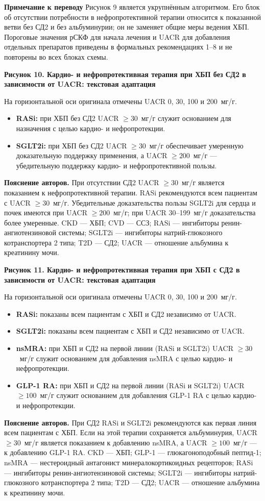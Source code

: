 \documentclass[11pt,a4paper]{article}
\newcommand{\editorial}[1]{\par\begingroup\small\color{black!70}\textbf{Примечание к переводу} #1\par\endgroup}
\newcommand{\heading}[1]{\par\medskip\textbf{#1}\par}
\begin{document}
\editorial{Рисунок 9 является укрупнённым алгоритмом. Его блок об отсутствии потребности в нефропротективной терапии относится к показанной ветви без СД2 и без альбуминурии; он не заменяет общие меры ведения ХБП. Пороговые значения рСКФ для начала лечения и UACR для добавления отдельных препаратов приведены в формальных рекомендациях 1--8 и не повторены во всех блоках схемы.}

\heading{Рисунок 10. Кардио- и нефропротективная терапия при ХБП без СД2 в зависимости от UACR: текстовая адаптация}
На горизонтальной оси оригинала отмечены UACR 0, 30, 100 и 200~мг/г.
\begin{itemize}
\item \textbf{RASi:} при ХБП без СД2 UACR $\geq30$~мг/г служит основанием для назначения с целью кардио- и нефропротекции.
\item \textbf{SGLT2i:} при ХБП без СД2 UACR $\geq30$~мг/г обеспечивает умеренную доказательную поддержку применения, а UACR $\geq200$~мг/г --- убедительную поддержку кардио- и нефропротективной пользы.
\end{itemize}
\textbf{Пояснение авторов.} При отсутствии СД2 UACR $\geq30$~мг/г является показанием к нефропротективной терапии. RASi рекомендуются всем пациентам с UACR $\geq30$~мг/г. Убедительные доказательства пользы SGLT2i для сердца и почек имеются при UACR $\geq200$~мг/г; при UACR 30--199~мг/г доказательства более умеренные. CKD --- ХБП; CVD --- ССЗ; RASi --- ингибиторы ренин-ангиотензиновой системы; SGLT2i --- ингибиторы натрий-глюкозного котранспортера 2 типа; T2D --- СД2; UACR --- отношение альбумина к креатинину мочи.

\heading{Рисунок 11. Кардио- и нефропротективная терапия при ХБП с СД2 в зависимости от UACR: текстовая адаптация}
На горизонтальной оси оригинала отмечены UACR 0, 30, 100 и 200~мг/г.
\begin{itemize}
\item \textbf{RASi:} показаны всем пациентам с ХБП и СД2 независимо от UACR.
\item \textbf{SGLT2i:} показаны всем пациентам с ХБП и СД2 независимо от UACR.
\item \textbf{nsMRA:} при ХБП и СД2 на первой линии (RASi и SGLT2i) UACR $\geq30$~мг/г служит основанием для добавления nsMRA с целью кардио- и нефропротекции.
\item \textbf{GLP-1 RA:} при ХБП и СД2 на первой линии (RASi и SGLT2i) UACR $\geq100$~мг/г служит основанием для добавления GLP-1 RA с целью кардио- и нефропротекции.
\end{itemize}
\textbf{Пояснение авторов.} При СД2 RASi и SGLT2i рекомендуются как первая линия всем пациентам с ХБП. Если на этой терапии сохраняется альбуминурия, UACR $\geq30$~мг/г является показанием к добавлению nsMRA, а UACR $\geq100$~мг/г --- к добавлению GLP-1 RA. CKD --- ХБП; GLP-1 --- глюкагоноподобный пептид-1; nsMRA --- нестероидный антагонист минералокортикоидных рецепторов; RASi --- ингибиторы ренин-ангиотензиновой системы; SGLT2i --- ингибиторы натрий-глюкозного котранспортера 2 типа; T2D --- СД2; UACR --- отношение альбумина к креатинину мочи.
\end{document}
